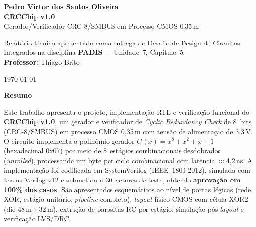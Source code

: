 \documentclass[12pt,a4paper]{article}
\newenvironment{resumoenv}{%
  \begin{center}\textbf{Resumo}\end{center}\small\setlength{\parindent}{0pt}}{}
\begin{document}
\begin{center}
  \vspace{1.5cm}
\end{center}
\newpage

\thispagestyle{empty}
\begin{center}
  \vspace*{2cm}
  {\large\bfseries Pedro Victor dos Santos Oliveira}\\[60pt]
  {\Large\bfseries CRCChip v1.0}\\[10pt]
  {\large Gerador/Verificador CRC-8/SMBUS em Processo CMOS 0,35\,\textmu m}\\[60pt]

  \begin{flushright}
    \begin{minipage}{8cm}
      Relatório técnico apresentado como entrega do Desafio de Design de Circuitos Integrados
      na disciplina \textbf{PADIS} --- Unidade~7, Capítulo~5.\\[12pt]
      \textbf{Professor:} Thiago Brito
    \end{minipage}
  \end{flushright}

  \vfill
  {\normalsize \today}
\end{center}
\newpage

\thispagestyle{empty}
\begin{resumoenv}
Este trabalho apresenta o projeto, implementação RTL e verificação funcional do \textbf{CRCChip v1.0}, um gerador e verificador de \textit{Cyclic Redundancy Check} de 8~bits (CRC-8/SMBUS) em processo CMOS 0,35\,\textmu m com tensão de alimentação de 3,3\,V. O circuito implementa o polinômio gerador $G(x) = x^8 + x^2 + x + 1$ (hexadecimal 0x07) por meio de 8~estágios combinacionais desdobrados (\textit{unrolled}), processando um byte por ciclo combinacional com latência $\approx$4,2\,ns. A implementação foi codificada em SystemVerilog (IEEE~1800-2012), simulada com Icarus Verilog v12 e submetida a 30~vetores de teste, obtendo \textbf{aprovação em 100\% dos casos}. São apresentados esquemáticos ao nível de portas lógicas (rede XOR, estágio unitário, \textit{pipeline} completo), \textit{layout} físico CMOS com célula XOR2 (die 48\,\textmu m\,$\times$\,32\,\textmu m), extração de parasitas RC por estágio, simulação pós-\textit{layout} e verificação LVS/DRC.
\end{resumoenv}
\end{document}
